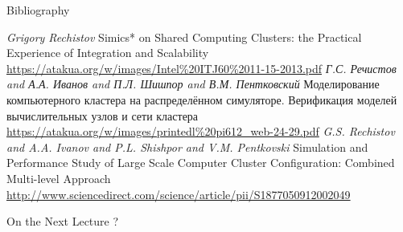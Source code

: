 \begin{frame}[allowframebreaks]{Bibliography}
\begin{thebibliography}{99}
   \textit{Grigory Rechistov} Simics* on Shared Computing Clusters: the Practical Experience of Integration and Scalability \url{https://atakua.org/w/images/Intel%20ITJ60%2011-15-2013.pdf}
   \textit{Г.С. Речистов and А.А. Иванов and П.Л. Шишпор and В.М. Пентковский} Моделирование компьютерного кластера на распределённом симуляторе. Верификация моделей вычислительных узлов и сети кластера \url{https://atakua.org/w/images/printedl%20pi612_web-24-29.pdf}
   \textit{G.S. Rechistov and A.A. Ivanov and P.L. Shishpor and V.M. Pentkovski} Simulation and Performance Study of Large Scale Computer Cluster Configuration: Combined Multi-level Approach \url{http://www.sciencedirect.com/science/article/pii/S1877050912002049}  

\end{thebibliography}
\end{frame}

\begin{frame}{On the Next Lecture}
?
\end{frame}

\finalslide


